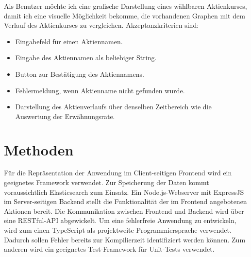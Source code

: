 \documentclass[a4paper, 10pt, conference]{IEEEtran}
\begin{document}
Als Benutzer möchte ich eine grafische Darstellung eines wählbaren Aktienkurses, damit ich eine visuelle Möglichkeit bekomme, die vorhandenen Graphen mit dem Verlauf des Aktienkurses zu vergleichen. Akzeptanzkriterien sind:
\begin{itemize}
\item Eingabefeld für einen Aktiennamen.
\item Eingabe des Aktiennamen als beliebiger String.
\item Button zur Bestätigung des Aktiennamens.
\item Fehlermeldung, wenn Aktienname nicht gefunden wurde.
\item Darstellung des Aktienverlaufs über denselben Zeitbereich wie die Auswertung der Erwähnungsrate.
\end{itemize}

\newpage
\section{Methoden} \label{s:methoden}

Für die Repräsentation der Anwendung im Client-seitigen Frontend wird ein geeignetes Framework verwendet. Zur Speicherung der Daten kommt voraussichtlich Elasticsearch zum Einsatz. Ein Node.js-Webserver mit ExpressJS im Server-seitigen Backend stellt die Funktionalität der im Frontend angebotenen Aktionen bereit. Die Kommunikation zwischen Frontend und Backend wird über eine RESTful-API abgewickelt. Um eine fehlerfreie Anwendung zu entwickeln, wird zum einen TypeScript als projektweite Programmiersprache verwendet. Dadurch sollen Fehler bereits zur Kompilierzeit identifiziert werden können. Zum anderen wird ein geeignetes Test-Framework für Unit-Tests verwendet.

\printbibliography
\end{document}
